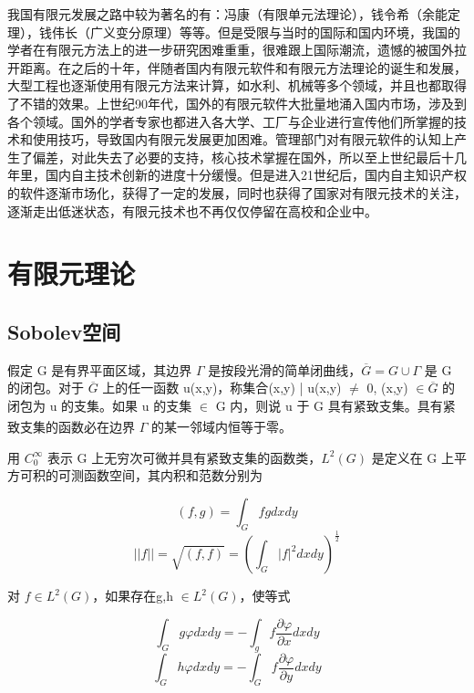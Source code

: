 \documentclass[a4paper,UTF8,titlepage]{ctexart}
\begin{document}
我国有限元发展之路中较为著名的有：冯康（有限单元法理论），钱令希（余能定理），钱伟长（广义变分原理）等等。但是受限与当时的国际和国内环境，我国的学者在有限元方法上的进一步研究困难重重，很难跟上国际潮流，遗憾的被国外拉开距离。在之后的十年，伴随者国内有限元软件和有限元方法理论的诞生和发展，大型工程也逐渐使用有限元方法来计算，如水利、机械等多个领域，并且也都取得了不错的效果。上世纪90年代，国外的有限元软件大批量地涌入国内市场，涉及到各个领域。国外的学者专家也都进入各大学、工厂与企业进行宣传他们所掌握的技术和使用技巧，导致国内有限元发展更加困难。管理部门对有限元软件的认知上产生了偏差，对此失去了必要的支持，核心技术掌握在国外，所以至上世纪最后十几年里，国内自主技术创新的进度十分缓慢。但是进入21世纪后，国内自主知识产权的软件逐渐市场化，获得了一定的发展，同时也获得了国家对有限元技术的关注，逐渐走出低迷状态，有限元技术也不再仅仅停留在高校和企业中。

\section{有限元理论}

\subsection{Sobolev空间}

假定 G 是有界平面区域，其边界 $\Gamma$ 是按段光滑的简单闭曲线，$\overline{G} = G \cup \Gamma$ 是 G 的闭包。对于 $\overline{G}$ 上的任一函数 u(x,y)，称集合{(x,y) | u(x,y) $\ne$ 0, (x,y) $\in \overline{G}$} 的闭包为 u 的支集。如果 u 的支集 $\in$ G 内，则说 u 于 G 具有紧致支集。具有紧致支集的函数必在边界 $\Gamma$ 的某一邻域内恒等于零\textsuperscript{\cite{李荣华2007偏微分方程数值解}}。

用 $C_0^{\infty} $ 表示 G 上无穷次可微并具有紧致支集的函数类，$L^2(G)$ 是定义在 G 上平方可积的可测函数空间，其内积和范数分别为

\begin{equation}
	(f,g) = \int_G fg dxdy
\end{equation}
\begin{equation}
	||f || = \sqrt{(f,f)} = (\int_G |f|^2 dxdy)^{\frac{1}{2}}
\end{equation}

对 $f \in L^2(G)$，如果存在g,h $\in L^2(G)$，使等式

\begin{equation}
	\int_G g \varphi dxdy = - \int_g f \frac{\partial \varphi}{\partial x} dxdy 
\end{equation}
\begin{equation}
	\int_G h \varphi dxdy = - \int_G f \frac{\partial \varphi}{\partial y} dxdy
\end{equation}
\end{document}

